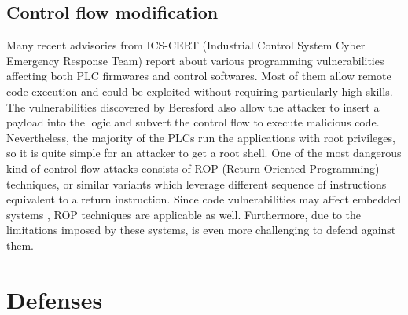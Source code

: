 \subsection{Control flow modification}

Many recent advisories \cite{schneider-bof,rockwell-vuln,rockwell-vuln2,elcsoft-vuln} from ICS-CERT (Industrial Control System Cyber Emergency Response Team)
report about various programming vulnerabilities affecting both PLC firmwares and control softwares. Most of them allow remote code execution and could be exploited
without requiring particularly high skills.
The vulnerabilities discovered by Beresford \cite{siemens-s7} also allow the attacker to insert a payload into the logic and subvert the control flow to execute
malicious code. Nevertheless, the majority of the PLCs run the applications with root privileges, so it is quite simple for an attacker to get a root shell.
One of the most dangerous kind of control flow attacks consists of ROP (Return-Oriented Programming) techniques, or similar variants \cite{jop,no-ret}
which leverage different sequence of instructions equivalent to a return instruction.
Since code vulnerabilities may affect embedded systems \cite{schneider-bof,rockwell-vuln,rockwell-vuln2,elcsoft-vuln,siemens-s7}, ROP techniques
are applicable as well. Furthermore, due to the limitations imposed by these systems, is even more challenging to defend against them.


\section{Defenses}


